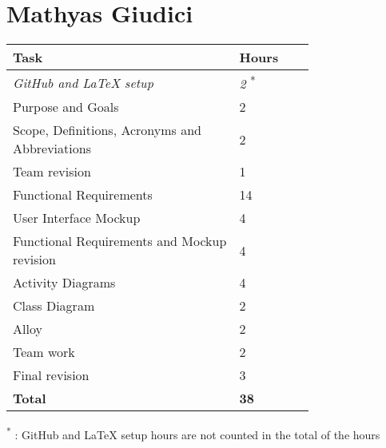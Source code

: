 \section{Mathyas Giudici}

\smallskip
\begin{center}
\begin{tabular}{ | p{0.75\linewidth} | l | }
  \hline
    \textbf{Task} & \textbf{Hours }\\ \hline
    \textit{GitHub and LaTeX setup} & \textit{2} \textsuperscript{*} \\ \hline
    Purpose and Goals & 2 \\ \hline
    Scope, Definitions, Acronyms and Abbreviations & 2 \\ \hline
    Team revision & 1 \\ \hline
    Functional Requirements & 14 \\ \hline
    User Interface Mockup & 4 \\ \hline
    Functional Requirements and Mockup revision & 4 \\ \hline
    Activity Diagrams & 4 \\ \hline
    Class Diagram & 2 \\ \hline
    Alloy & 2 \\ \hline
    Team work & 2 \\ \hline
    Final revision & 3 \\ \hline
    \textbf{Total} & \textbf{38} \\ \hline
\end{tabular}
\end{center}

\textsuperscript{*} : GitHub and LaTeX setup hours are not counted in the total of the hours

\clearpage
